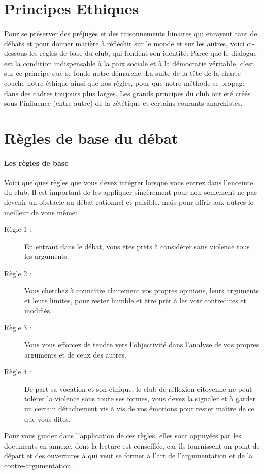 \documentclass[a4paper,11pt]{article}
\begin{document}
\section{Principes Ethiques}
\paragraph{} 
Pour se préserver des préjugés et des raisonnements binaires qui enrayent tant de débats et pour donner matière à réfléchir sur le monde et sur les autres, voici ci-dessous les règles de base du club, qui fondent son identité. Parce que le dialogue est la condition indispensable à la paix sociale et à la démocratie véritable, c'est sur ce principe que se fonde notre démarche. La suite de la tête de la charte couche notre éthique ainsi que nos règles, pour que notre méthode se propage dans des cadres toujours plus larges. Les grands principes du club ont été créés sous l'influence (entre autre) de la zététique et certains courants anarchistes.

\section{Règles de base du débat}

\paragraph{Les règles de base}
Voici quelques règles que vous devez intégrer lorsque vous entrez dans l'enceinte du club. Il est important de les appliquer sincèrement pour non seulement ne pas devenir un obstacle au débat rationnel et paisible, mais pour offrir aux autres le meilleur de vous même:
\begin{description}
 \item[Règle 1 :] En entrant dans le débat, vous êtes prêts à considérer sans violence tous les arguments.
 \item[Règle 2 :] Vous cherchez à connaître clairement vos propres opinions, leurs arguments et leurs limites, pour rester humble et être prêt à les voir contredites et modifiés.
 \item[Règle 3 :] Vous vous efforcez de tendre vers l'objectivité dans l'analyse de vos propres arguments et de ceux des autres.
 \item[Règle 4 :] De part sa vocation et son éthique, le club de réflexion citoyenne ne peut tolérer la violence sous toute ses formes, vous devez la signaler et à garder un certain détachement vis à vis de vos émotions pour rester maître de ce que vous dites.
\end{description}
Pour vous guider dans l'application de ces règles, elles sont appuyées par les documents en annexe, dont la lecture est conseillée, car ils fournissent un point de départ et des ouvertures à qui veut se former à l'art de l'argumentation et de la contre-argumentation. 
\end{document}
